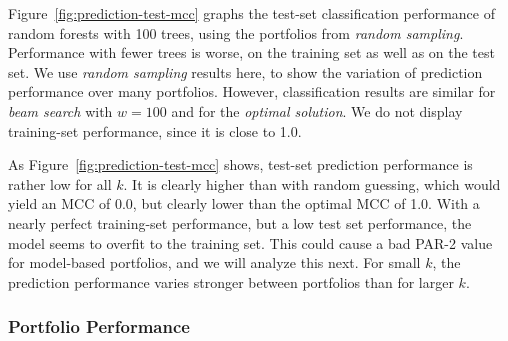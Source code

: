 \documentclass[conference]{IEEEtran}
\begin{document}
Figure~\ref{fig:prediction-test-mcc} graphs the test-set classification performance of random forests with 100 trees, using the portfolios from \emph{random sampling}.
Performance with fewer trees is worse, on the training set as well as on the test set.
We use \emph{random sampling} results here, to show the variation of prediction performance over many portfolios.
However, classification results are similar for \emph{beam search} with $w=100$ and for the \emph{optimal solution}.
We do not display training-set performance, since it is close to 1.0.

As Figure~\ref{fig:prediction-test-mcc} shows, test-set prediction performance is rather low for all $k$.
It is clearly higher than with random guessing, which would yield an MCC of 0.0, but clearly lower than the optimal MCC of 1.0.
With a nearly perfect training-set performance, but a low test set performance, the model seems to overfit to the training set.
This could cause a bad PAR-2 value for model-based portfolios, and we will analyze this next.
For small $k$, the prediction performance varies stronger between portfolios than for larger $k$.

\subsubsection{Portfolio Performance}
\end{document}
